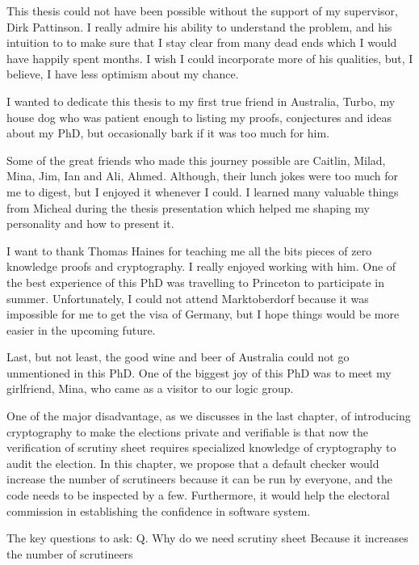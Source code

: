 This thesis could not have been possible without the support of my supervisor, Dirk Pattinson. I really admire
 his ability to understand the problem, and his intuition to to make sure that I stay clear from many dead ends 
 which I would have happily spent months. I wish I could incorporate more of his qualities, but, I believe, I have
 less optimism about my chance. 
 
 I wanted to dedicate this thesis to my first true friend in Australia, Turbo, my house dog who was patient enough to 
 listing my proofs, conjectures and ideas about my PhD, but occasionally  bark if it was too much for him. 
 
 Some of the great friends who made this journey possible are Caitlin, Milad, Mina, Jim, Ian and Ali, Ahmed. Although, 
 their lunch jokes were too much for me to digest, but I enjoyed it whenever I could.  I learned many valuable things 
 from Micheal during the thesis presentation which helped me shaping my personality and how to present it. 
 
 I want to thank Thomas Haines for teaching me all the bits pieces of zero knowledge proofs and cryptography. I really 
 enjoyed working with him. One of the best experience of this PhD was travelling to Princeton to participate in summer. 
 Unfortunately, I could not attend Marktoberdorf because it was impossible for me to get the visa of Germany, but I hope
 things would be more easier in the upcoming future. 

Last, but not least, the good wine and beer of Australia could not go unmentioned in this PhD. 
One of the biggest joy of this PhD was to meet my girlfriend, Mina, who came as a visitor to our logic group. 

One of the major disadvantage, as we discusses in the last chapter, of introducing cryptography to make the elections 
private and verifiable is that now the verification of scrutiny sheet requires specialized knowledge of cryptography
to audit the election.  In this chapter, we propose that a default checker would increase the number of scrutineers 
because it can be run by everyone, and the code needs to be inspected by a few. Furthermore, it would help the 
electoral commission in establishing  the confidence in software system.  





The key questions to ask: 
Q. Why do we need scrutiny sheet
Because it increases the number of scrutineers 


